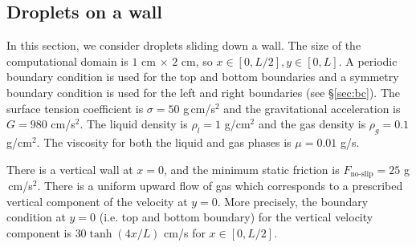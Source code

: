 \documentclass{jfm}
\newcommand{\daniel}[1]{\todo[inline,color=yellow!40]{Daniel: #1}}
\newcommand{\charles}[1]{\todo[inline,color=blue!40]{Charles: #1}}
\begin{document}
\subsection {Droplets on a wall} \label{subsec:dow}
In this section, we consider droplets sliding down a wall. The size of the computational domain is $1$ cm $\times$ $2$ cm, so $x\in[0, L/2], y \in [0, L]$. A periodic boundary condition is used for the top and bottom boundaries and a symmetry boundary condition is used for the left and right boundaries (see \S\ref{sec:bc}). The surface tension coefficient is $\sigma=50$ g\,cm/s$^2$ and the gravitational acceleration is $G=980$ cm/s$^2$. The liquid density is $\rho_l=1$ g/cm$^2$ and the gas density is $\rho_g=0.1$ g/cm$^2$. The viscosity for both the liquid and gas phases is $\mu=0.01$ g/s. 
    
There is a vertical wall at $x=0$, and the minimum static friction is $F_\text{no-slip}=25$ g$\,$cm/s$^2$. There is a uniform upward flow of gas which corresponds to a prescribed vertical component of the velocity at $y=0$. More precisely, the boundary condition at $y=0$ (i.e. top and bottom boundary) for the vertical velocity component is $30\tanh(4x / L)$ cm/s for $x \in [0, L/2]$. 
\end{document}
